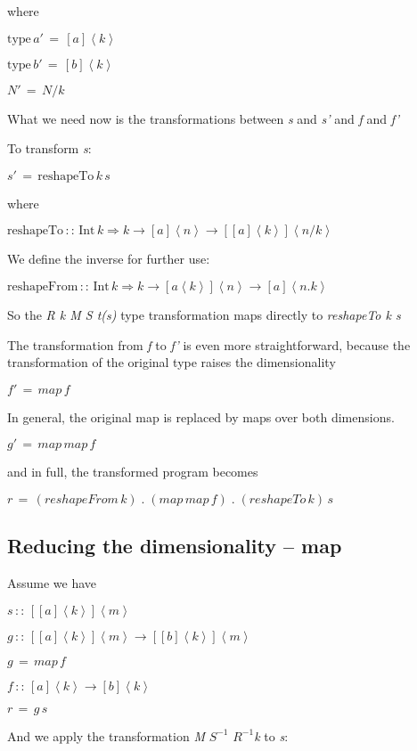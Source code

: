 \documentclass{article}
\newenvironment{lyxcode}
{\par\begin{list}{}{
\setlength{\rightmargin}{\leftmargin}
\setlength{\listparindent}{0pt}\raggedright
\setlength{\itemsep}{0pt}
\setlength{\parsep}{0pt}
\normalfont\ttfamily}\item[]}
{\end{list}}
\begin{document}
where
\begin{lyxcode}
$\mbox{type}\, a'\,=\,[a]\left\langle k\right\rangle $

$\mbox{type}\, b'\,=\,[b]\left\langle k\right\rangle $

$N'\,=\, N/k$
\end{lyxcode}
What we need now is the transformations between \emph{s} and \emph{s'}
and \emph{f} and \emph{f'}

To transform \emph{s}:
\begin{lyxcode}
$s'\,=\,\mbox{reshapeTo}\, k\, s$
\end{lyxcode}
where
\begin{lyxcode}
$\mbox{reshapeTo}\,::\,\mbox{Int}\, k\Rightarrow k\rightarrow[a]\left\langle n\right\rangle \rightarrow[[a]\left\langle k\right\rangle ]\left\langle n/k\right\rangle $
\end{lyxcode}
We define the inverse for further use:
\begin{lyxcode}
$\mbox{reshapeFrom}\,::\,\mbox{Int}\, k\Rightarrow k\rightarrow[a\left\langle k\right\rangle ]\left\langle n\right\rangle \rightarrow[a]\left\langle n.k\right\rangle $
\end{lyxcode}
So the \emph{R k M S t(s)} type transformation maps directly to \emph{reshapeTo
k s}

The transformation from \emph{f} to \emph{f'} is even more straightforward,
because the transformation of the original type raises the dimensionality
\begin{lyxcode}
$f'\,=\, map\, f$
\end{lyxcode}
In general, the original map is replaced by maps over both dimensions.
\begin{lyxcode}
$g'\,=\, map\,map\, f$
\end{lyxcode}
and in full, the transformed program becomes

\begin{lyxcode}
$r\,=\, (reshapeFrom \,k) \; .\; (map\,map\, f) \;.\; (reshapeTo\,k)\,  s$
\end{lyxcode}


\subsection{Reducing the dimensionality -- map}

Assume we have
\begin{lyxcode}
\textrm{$s\,::\,[[a]\left\langle k\right\rangle ]\left\langle m\right\rangle $}

\textrm{$g\,::\,[[a]\left\langle k\right\rangle ]\left\langle m\right\rangle \rightarrow[[b]\left\langle k\right\rangle ]\left\langle m\right\rangle $}

$g\,=\, map\, f$

$f\,::\,[a]\left\langle k\right\rangle \rightarrow[b]\left\langle k\right\rangle $

$r\,=\, g\, s$
\end{lyxcode}
And we apply the transformation\emph{ M }$S^{-1}$ $R^{-1}$\emph{k}
to \emph{s}:
\end{document}
